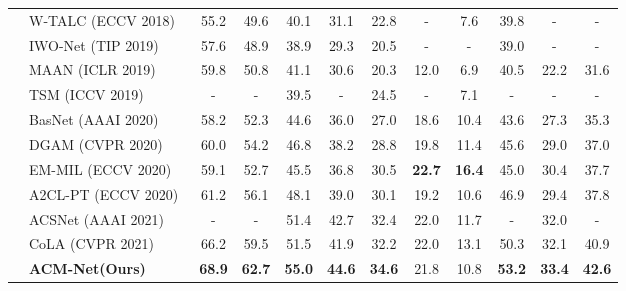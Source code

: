 \documentclass[journal,comsoc]{IEEEtran}
\begin{document}
\begin{table*}[ht]
{\begin{tabular}{clcccccccccc}
            &W-TALC (ECCV 2018)~\cite{WTALC}    &55.2 &49.6 &40.1 &31.1 &22.8 &- &7.6 &39.8 &- &-  \\
            &IWO-Net (TIP 2019)~\cite{IWONet} &57.6	&48.9 &38.9	&29.3 &20.5 &- &- &39.0 &- &-\\
            &MAAN (ICLR 2019)~\cite{MAAN}   &59.8 &50.8 &41.1 &30.6 &20.3 &12.0 &6.9 &40.5 &22.2 &31.6  \\
            &TSM (ICCV 2019)~\cite{TSM}   &- &- &39.5 &- &24.5 &- &7.1 &- &- &- \\
            &BasNet (AAAI 2020)~\cite{BASNet}   &58.2 &52.3 &44.6 &36.0 &27.0 &18.6 &10.4 &43.6 &27.3 &35.3   \\
            &DGAM (CVPR 2020)~\cite{DGAM}   &60.0 &54.2 &46.8 &38.2 &28.8 &19.8 &11.4 &45.6 &29.0 &37.0  \\
            &EM-MIL (ECCV 2020)~\cite{EMMIL}   &59.1 &52.7 &45.5 &36.8 &30.5 &\bf{22.7} &\bf{16.4} &45.0 &30.4 &37.7  \\
            &A2CL-PT (ECCV 2020)~\cite{A2CLPT}   &61.2 &56.1 &48.1 &39.0 &30.1 &19.2 &10.6 &46.9 &29.4 &37.8  \\
            &ACSNet (AAAI 2021)~\cite{ACSNET}   &- &- &51.4 &42.7 &32.4 &22.0 &11.7 &- &32.0 &-  \\
            &CoLA (CVPR 2021)~\cite{CoLA} &66.2 &59.5 &51.5 &41.9 &32.2 &22.0 &13.1 &50.3 &32.1 &40.9\\  
            &\bf{ACM-Net(Ours)}   &\bf{68.9} &\bf{62.7} &\bf{55.0} &\bf{44.6} &\bf{34.6} &21.8 &10.8 &\bf{53.2} &\bf{33.4} &\bf{42.6}  \\
			\bottomrule
	\end{tabular}}
	\label{table:comparison_thu14}
\end{table*}
\end{document}
